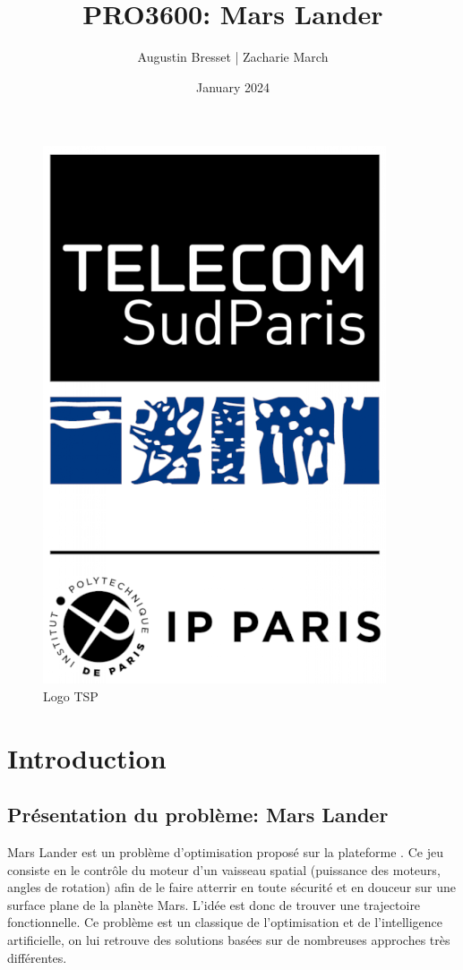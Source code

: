 \documentclass[french,a4paper,10pt,twocolumn]{article}
\title{PRO3600: Mars Lander}
\author{Augustin Bresset | Zacharie March}
\date{January 2024}
\begin{document}
\onecolumn
\maketitle

\begin{figure}[H]
    \centering
    \includegraphics[scale=0.2]{images/logo-tsp-fond-blanc.png}
    \caption{Logo TSP}\label{fig:logo}
\end{figure}

\tableofcontents
\pagebreak
\section{Introduction}

\subsection{Présentation du problème: Mars Lander}

Mars Lander est un problème d'optimisation proposé sur la plateforme \cite[]{codingame_mars_lander}.
Ce jeu consiste en le contrôle du moteur d'un vaisseau spatial (puissance des moteurs, angles de rotation) 
afin de le faire atterrir en toute sécurité et en douceur sur une surface plane de la planète Mars. 
L'idée est donc de trouver une trajectoire fonctionnelle. Ce problème est un classique de l'optimisation et de l'intelligence artificielle,
on lui retrouve des solutions basées sur de nombreuses approches très différentes.
\end{document}
